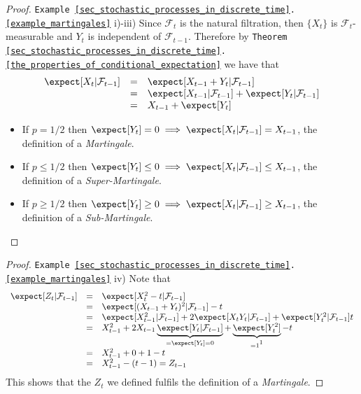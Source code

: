 \documentclass[11pt,a4paper]{article}
\begin{document}
  \begin{proof}{\texttt{Example \ref{sec_stochastic_processes_in_discrete_time}.\ref{example_martingales}} i)-iii) }
    Since $\mathcal{F}_t$ is the natural filtration, then $\{X_t\}$ is $\mathcal{F}_t$-measurable and $Y_t$ is independent of $\mathcal{F}_{t-1}$. Therefore by \texttt{Theorem \ref{sec_stochastic_processes_in_discrete_time}.\ref{the_properties_of_conditional_expectation}} we have that
    \[\begin{array}{rcl}
      \expect[X_t|\mathcal{F}_{t-1}]&=&\expect[X_{t-1}+Y_t|\mathcal{F}_{t-1}]\\
      &=&\expect[X_{t-1}|\mathcal{F}_{t-1}]+\expect[Y_t|\mathcal{F}_{t-1}]\\
      &=&X_{t-1}+\expect[Y_t]
    \end{array}\]
    \begin{itemize}
      \item If $p=1/2$ then $\expect[Y_t]=0\implies\expect[X_t|\mathcal{F}_{t-1}]=X_{t-1}$, the definition of a \textit{Martingale}.
      \item If $p\leq1/2$ then $\expect[Y_t]\leq0\implies\expect[X_t|\mathcal{F}_{t-1}]\leq X_{t-1}$, the definition of a \textit{Super-Martingale}.
      \item If $p\geq1/2$ then $\expect[Y_t]\geq0\implies\expect[X_t|\mathcal{F}_{t-1}]\geq X_{t-1}$, the definition of a \textit{Sub-Martingale}.
    \end{itemize}
  \end{proof}

  \begin{proof}{\texttt{Example \ref{sec_stochastic_processes_in_discrete_time}.\ref{example_martingales}} iv) }
    Note that
    \[\begin{array}{rcl}
      \expect[Z_t|\mathcal{F}_{t-1}]&=&\expect[X_t^2-t|\mathcal{F}_{t-1}]\\
      &=&\expect[(X_{t-1}+Y_t)^2|\mathcal{F}_{t-1}]-t\\
      &=&\expect[X_{t-1}^2|\mathcal{F}_{t-1}]+2\expect[X_tY_t|\mathcal{F}_{t-1}]+\expect[Y_t^2|\mathcal{F}_{t-1}]t\\
      &=&X_{t-1}^2+2X_{t-1}\underbrace{\expect[Y_t|\mathcal{F}_{t-1}]}_{=\expect[Y_t]=0}+\underbrace{\expect[Y_t^2]}_{=1\footnotemark}-t\\
      &=&X_{t-1}^2+0+1-t\\
      &=&X_{t-1}^2-(t-1)=Z_{t-1}
    \end{array}\]
    This shows that the $Z_t$ we defined fulfils the definition of a \textit{Martingale}.
  \end{proof}
\end{document}
